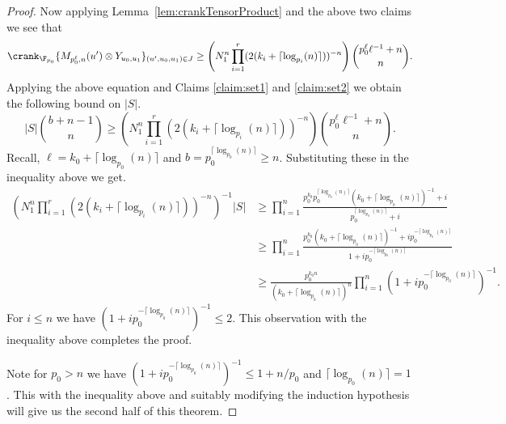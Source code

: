 \begin{proof}
Now applying Lemma~\ref{lem:crankTensorProduct} and the above two claims we see that
$$\crank_{\F_{p_0}} \{M_{p_0^{\ell},n}(u')\otimes Y_{u_0,u_1}\}_{(u',u_0,u_1)\in J}\ge \left(N_1^n\prod\limits_{i=1}^r (2(k_i+\lceil \log_{p_i}(n)\rceil))^{-n}\right)\binom{p_0^\ell \ell^{-1}+n}{n}. $$
Applying the above equation and Claims \ref{claim:set1} and \ref{claim:set2} we obtain the following bound on $|S|$.
$$|S|\binom{b+n-1}{n}\ge \left(N_1^n\prod\limits_{i=1}^r (2(k_i+\lceil \log_{p_i}(n)\rceil))^{-n}\right)\binom{p_0^\ell \ell^{-1}+n}{n}.$$
Recall, $\ell=k_0+\lceil \log_{p_0}(n)\rceil$ and $b=p_0^{\lceil \log_{p_0}(n)\rceil}\ge n$. Substituting these in the inequality above we get.
\begin{align*}
    \left(N_1^n\prod\limits_{i=1}^r (2(k_i+\lceil \log_{p_i}(n)\rceil))^{-n}\right)^{-1}|S|  &\ge  \prod\limits_{i=1}^n \frac{p_0^{k_0} p_0^{\lceil \log_{p_0}(n)\rceil} (k_0+\lceil \log_{p_0}(n)\rceil)^{-1} +i}{p_0^{\lceil \log_{p_0}(n)\rceil} +i}\\
    &\ge \prod\limits_{i=1}^n \frac{ p_0^{k_0}(k_0+\lceil \log_{p_0}(n)\rceil)^{-1} +i p_0^{-\lceil \log_{p_0}(n)\rceil}}{1+i  p_0^{-\lceil \log_{p_0}(n)\rceil}}\\
    &\ge \frac{p_0^{k_0n}}{(k_0+\lceil \log_{p_0}(n)\rceil)^{n}} \prod\limits_{i=1}^n\left(1+i p_0^{-\lceil \log_{p_0}(n)\rceil} \right)^{-1}.
\end{align*}
For $i\le n$ we have $\left(1+i p_0^{-\lceil \log_{p_0}(n)\rceil} \right)^{-1}\le 2$. This observation with the inequality above completes the proof.

Note for $p_0>n$ we have $\left(1+i p_0^{-\lceil \log_{p_0}(n)\rceil} \right)^{-1}\le 1+n/p_0$ and $\lceil\log_{p_0}(n)\rceil=1$. This with the inequality above and suitably modifying the induction hypothesis will give us the second half of this theorem.
\end{proof}

